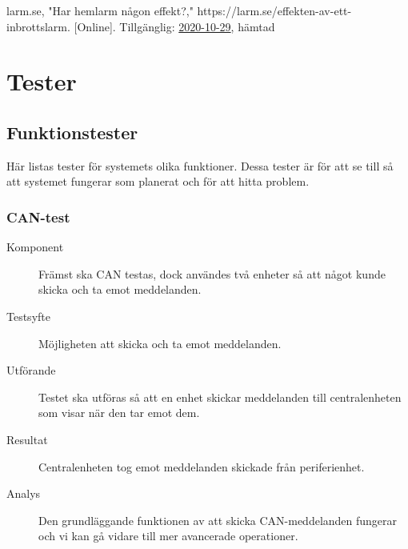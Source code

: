 \documentclass[a4paper]{article}
\newcommand{\citewebpage}[6]{\noindent [#1] #2, "#3," #4. [Online]. Tillgänglig: \url{#5},  hämtad #6}
\begin{document}
\citewebpage{2}{larm.se}{Har hemlarm någon effekt?}{https://larm.se/effekten-av-ett-inbrottslarm}{2020-10-29}

\newpage
\appendix
\section{Tester}
\label{bilaga-tester}
\subsection{Funktionstester}
Här listas tester för systemets olika funktioner.
Dessa tester är för att se till så att systemet fungerar som planerat och för att hitta problem.

\subsubsection{CAN-test}
\begin{description}
\item[Komponent] Främst ska CAN testas, dock användes två enheter så att något kunde skicka och ta emot meddelanden.

\item[Testsyfte] Möjligheten att skicka och ta emot meddelanden.

\item[Utförande] Testet ska utföras så att en enhet skickar meddelanden till centralenheten som visar när den tar emot dem.

\item[Resultat] Centralenheten tog emot meddelanden skickade från periferienhet.

\item[Analys] Den grundläggande funktionen av att skicka CAN-meddelanden fungerar och vi kan gå vidare till mer avancerade operationer.
\end{description}
\end{document}
